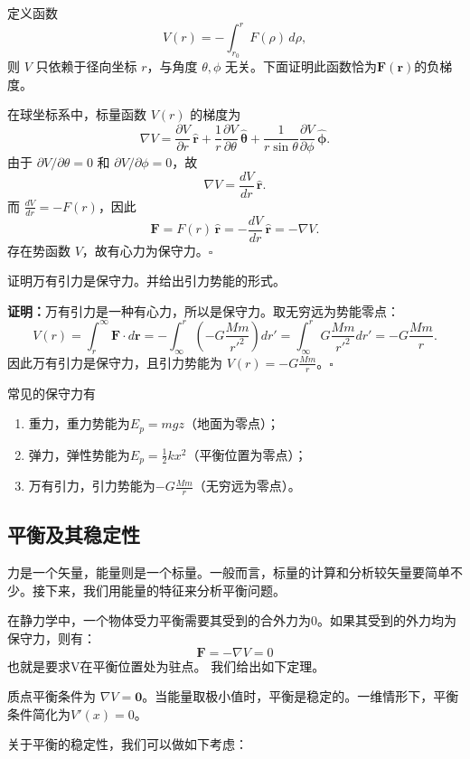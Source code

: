 定义函数
\[
    V(r) = -\int_{r_0}^{r} F(\rho)\,d\rho,
\]
则 \(V\) 只依赖于径向坐标 \(r\)，与角度 \(\theta,\phi\) 无关。下面证明此函数恰为$\mathbf{F}(\mathbf{r}) $的负梯度。

在球坐标系中，标量函数 \(V(r)\) 的梯度为
\[
    \nabla V = \frac{\partial V}{\partial r}\,\hat{\mathbf{r}} + \frac{1}{r}\frac{\partial V}{\partial \theta}\,\hat{\boldsymbol{\theta}} + \frac{1}{r\sin\theta}\frac{\partial V}{\partial \phi}\,\hat{\boldsymbol{\phi}}.
\]
由于 \(\partial V/\partial\theta = 0\) 和 \(\partial V/\partial\phi = 0\)，故
\[
    \nabla V = \frac{dV}{dr}\,\hat{\mathbf{r}}.
\]
而 \(\frac{dV}{dr} = -F(r)\)，因此
\[
    \mathbf{F} = F(r)\,\hat{\mathbf{r}} = -\frac{dV}{dr}\,\hat{\mathbf{r}} = -\nabla V.
\]
存在势函数 \(V\)，故有心力为保守力。\hfill$\square$
\begin{tcolorbox}[colback=white!5!white,colframe=green!50!black,title=万有引力]
    证明万有引力是保守力。并给出引力势能的形式。
\end{tcolorbox}
\noindent \textbf{证明：}万有引力是一种有心力，所以是保守力。取无穷远为势能零点：
\[
    V(r) = \int_{r}^{\infty} \mathbf{F}\cdot d\mathbf{r} = -\int_{\infty}^{r} \left(-G\frac{Mm}{r'^2}\right) dr' = \int_{\infty}^{r} G\frac{Mm}{r'^2} dr' = -G\frac{Mm}{r}.
\]
因此万有引力是保守力，且引力势能为 \(V(r) = -G\frac{Mm}{r}\)。\hfill$\square$
\begin{tcolorbox}[colback=white!5!white, colframe=red!75!black, title=常见保守力小结]
    常见的保守力有
    \begin{enumerate}
        \item 重力，重力势能为$E_p = mgz$（地面为零点）；
        \item 弹力，弹性势能为$E_p =  \frac{1}{2}k x^2 $（平衡位置为零点）；
        \item 万有引力，引力势能为$-G\frac{Mm}{r}$（无穷远为零点）。
    \end{enumerate}
\end{tcolorbox}
\subsection{平衡及其稳定性}
力是一个矢量，能量则是一个标量。一般而言，标量的计算和分析较矢量要简单不少。接下来，我们用能量的特征来分析平衡问题。

在静力学中，一个物体受力平衡需要其受到的合外力为0。如果其受到的外力均为保守力，则有：
\[
    \mathbf{F}=-\nabla V = 0
\]
也就是要求V在平衡位置处为驻点。
我们给出如下定理。
\begin{tcolorbox}[colback=white!5!white,colframe=green!50!black,title=平衡条件及其稳定性]
    质点平衡条件为 \(\nabla V = \mathbf{0}\)。当能量取极小值时，平衡是稳定的。一维情形下，平衡条件简化为$V'(x) = 0$。
\end{tcolorbox}
关于平衡的稳定性，我们可以做如下考虑：

